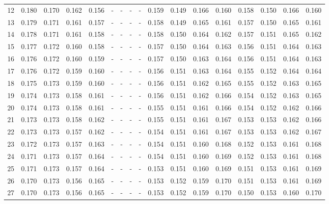 \documentclass{report}
\begin{document}
\begin{appendices}
\begin{sidewaystable}
\begin{tabular}{|c|cccc|cccc|cccc|cccc|}
12 & 0.180 & 0.170 & 0.162 & 0.156 &   -   &   -   &   -   &   -   & 0.159 & 0.149 & 0.166 & 0.160 & 0.158 & 0.150 & 0.166 & 0.160\\
13 & 0.179 & 0.171 & 0.161 & 0.157 &   -   &   -   &   -   &   -   & 0.158 & 0.149 & 0.165 & 0.161 & 0.157 & 0.150 & 0.165 & 0.161\\
14 & 0.178 & 0.171 & 0.161 & 0.158 &   -   &   -   &   -   &   -   & 0.158 & 0.150 & 0.164 & 0.162 & 0.157 & 0.151 & 0.165 & 0.162\\
15 & 0.177 & 0.172 & 0.160 & 0.158 &   -   &   -   &   -   &   -   & 0.157 & 0.150 & 0.164 & 0.163 & 0.156 & 0.151 & 0.164 & 0.163\\
16 & 0.176 & 0.172 & 0.160 & 0.159 &   -   &   -   &   -   &   -   & 0.157 & 0.150 & 0.163 & 0.164 & 0.156 & 0.151 & 0.164 & 0.163\\
17 & 0.176 & 0.172 & 0.159 & 0.160 &   -   &   -   &   -   &   -   & 0.156 & 0.151 & 0.163 & 0.164 & 0.155 & 0.152 & 0.164 & 0.164\\
18 & 0.175 & 0.173 & 0.159 & 0.160 &   -   &   -   &   -   &   -   & 0.156 & 0.151 & 0.162 & 0.165 & 0.155 & 0.152 & 0.163 & 0.165\\
19 & 0.174 & 0.173 & 0.158 & 0.161 &   -   &   -   &   -   &   -   & 0.156 & 0.151 & 0.162 & 0.166 & 0.154 & 0.152 & 0.163 & 0.165\\
20 & 0.174 & 0.173 & 0.158 & 0.161 &   -   &   -   &   -   &   -   & 0.155 & 0.151 & 0.161 & 0.166 & 0.154 & 0.152 & 0.162 & 0.166\\
21 & 0.173 & 0.173 & 0.158 & 0.162 &   -   &   -   &   -   &   -   & 0.155 & 0.151 & 0.161 & 0.167 & 0.153 & 0.153 & 0.162 & 0.166\\
22 & 0.173 & 0.173 & 0.157 & 0.162 &   -   &   -   &   -   &   -   & 0.154 & 0.151 & 0.161 & 0.167 & 0.153 & 0.153 & 0.162 & 0.167\\
23 & 0.172 & 0.173 & 0.157 & 0.163 &   -   &   -   &   -   &   -   & 0.154 & 0.151 & 0.160 & 0.168 & 0.152 & 0.153 & 0.161 & 0.168\\
24 & 0.171 & 0.173 & 0.157 & 0.164 &   -   &   -   &   -   &   -   & 0.154 & 0.151 & 0.160 & 0.169 & 0.152 & 0.153 & 0.161 & 0.168\\
25 & 0.171 & 0.173 & 0.157 & 0.164 &   -   &   -   &   -   &   -   & 0.153 & 0.151 & 0.160 & 0.169 & 0.151 & 0.153 & 0.161 & 0.169\\
26 & 0.170 & 0.173 & 0.156 & 0.165 &   -   &   -   &   -   &   -   & 0.153 & 0.152 & 0.159 & 0.170 & 0.151 & 0.153 & 0.161 & 0.169\\
27 & 0.170 & 0.173 & 0.156 & 0.165 &   -   &   -   &   -   &   -   & 0.153 & 0.152 & 0.159 & 0.170 & 0.150 & 0.153 & 0.160 & 0.170\\

\end{tabular}
\end{sidewaystable}
\end{appendices}
\end{document}
